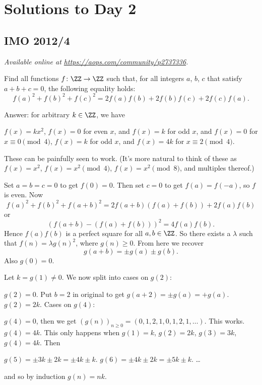 \documentclass[11pt]{scrartcl}
\begin{document}
\section{Solutions to Day 2}
\subsection{IMO 2012/4}
\textsl{Available online at \url{https://aops.com/community/p2737336}.}
\begin{mdframed}[style=mdpurplebox,frametitle={Problem statement}]
Find all functions $f \colon \ZZ \to \ZZ$ such that,
for all integers $a$, $b$, $c$ that satisfy $a+b+c=0$,
the following equality holds:
\[ f(a)^2+f(b)^2+f(c)^2 = 2f(a)f(b)+2f(b)f(c)+2f(c)f(a). \]
\end{mdframed}
Answer: for arbitrary $k \in \ZZ$, we have
\begin{enumerate}[(i)]
  \ii $f(x) = kx^2$,
  \ii $f(x) = 0$ for even $x$, and $f(x) = k$ for odd $x$, and
  \ii $f(x) = 0$ for $x \equiv 0 \pmod 4$,
  $f(x) = k$ for odd $x$, and $f(x) = 4k$ for $x \equiv 2 \pmod 4$.
\end{enumerate}
These can be painfully seen to work.
(It's more natural to think of these as
$f(x) = x^2$, $f(x) = x^2 \pmod 4$, $f(x) = x^2 \pmod 8$,
and multiples thereof.)

Set $a=b=c=0$ to get $f(0)=0$.
Then set $c=0$ to get $f(a) = f(-a)$, so $f$ is even.
Now \[ f(a)^2 + f(b)^2 + f(a+b)^2
= 2f(a+b)\left( f(a)+f(b) \right) + 2f(a)f(b) \]
or
\[ \left( f(a+b) - \left( f(a)+f(b) \right) \right)^2
  = 4f(a)f(b). \]
Hence $f(a)f(b)$ is a perfect square for all $a,b \in \ZZ$.
So there exists a $\lambda$ such that $f(n) = \lambda g(n)^2$, where $g(n) \ge 0$.
From here we recover
\[ \boxed{g(a+b) = \pm g(a) \pm g(b)}. \]
Also $g(0) = 0$.

Let $k = g(1) \neq 0$.
We now split into cases on $g(2)$:
\begin{itemize}
  \ii $g(2) = 0$. Put $b = 2$ in original to get
  $g(a+2) = \pm g(a) = +g(a)$.
  \ii $g(2) = 2k$. Cases on $g(4)$:
  \begin{itemize}
    \ii $g(4) = 0$, then we get
    $(g(n))_{n\ge0} = (0,1,2,1,0,1,2,1,\dots)$.  This works.
    \ii $g(4) = 4k$. This only happens when
    $g(1) = k$, $g(2) = 2k$, $g(3) = 3k$, $g(4) = 4k$.
    Then
    \begin{itemize}
      \ii $g(5) = \pm 3k \pm 2k = \pm 4k \pm k$.
      \ii $g(6) = \pm4k \pm 2k = \pm5k \pm k$.
      \ii \dots
    \end{itemize}
    and so by induction $g(n) = nk$.
  \end{itemize}
\end{itemize}
\pagebreak
\end{document}
